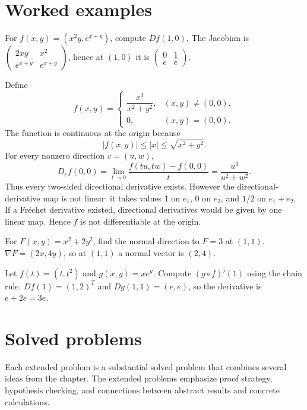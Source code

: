 \section{Worked examples}

\begin{example}\label{ex:ii08-worked-01}
For $f(x,y)=(x^2y,e^{x+y})$, compute $Df(1,0)$. The Jacobian is $\begin{pmatrix}2xy&x^2\\e^{x+y}&e^{x+y}\end{pmatrix}$, hence at $(1,0)$ it is $\begin{pmatrix}0&1\\e&e\end{pmatrix}$.
\end{example}

\begin{example}\label{ex:ii08-worked-02}
Define
\[
f(x,y)=
\begin{cases}
\dfrac{x^3}{x^2+y^2},&(x,y)\ne(0,0),\\[0.4em]
0,&(x,y)=(0,0).
\end{cases}
\]
The function is continuous at the origin because
\[
|f(x,y)|\le |x|\le\sqrt{x^2+y^2}.
\]
For every nonzero direction $v=(u,w)$,
\[
D_vf(0,0)=\lim_{t\to0}\frac{f(tu,tw)-f(0,0)}{t}
=\frac{u^3}{u^2+w^2}.
\]
Thus every two-sided directional derivative exists. However the directional-derivative map is not linear: it takes values $1$ on $e_1$, $0$ on $e_2$, and $1/2$ on $e_1+e_2$. If a Fr\'echet derivative existed, directional derivatives would be given by one linear map. Hence $f$ is not differentiable at the origin.
\end{example}

\begin{example}\label{ex:ii08-worked-03}
For $F(x,y)=x^2+2y^2$, find the normal direction to $F=3$ at $(1,1)$. $\nabla F=(2x,4y)$, so at $(1,1)$ a normal vector is $(2,4)$.
\end{example}

\begin{example}\label{ex:ii08-worked-04}
Let $f(t)=(t,t^2)$ and $g(x,y)=xe^y$. Compute $(g\circ f)'(1)$ using the chain rule. $Df(1)=(1,2)^T$ and $Dg(1,1)=(e,e)$, so the derivative is $e+2e=3e$.
\end{example}

\section{Solved problems}
Each extended problem is a substantial solved problem that combines several ideas from the chapter. The extended problems emphasize proof strategy, hypothesis checking, and connections between abstract results and concrete calculations.

